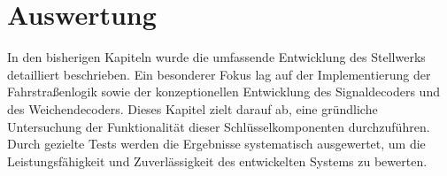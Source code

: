 \chapter{Auswertung}\label{text:Auswertung}

In den bisherigen Kapiteln wurde die umfassende Entwicklung des Stellwerks detailliert beschrieben. Ein besonderer Fokus lag auf der Implementierung der Fahrstraßenlogik sowie der konzeptionellen Entwicklung des Signaldecoders und des Weichendecoders. Dieses Kapitel zielt darauf ab, eine gründliche Untersuchung der Funktionalität dieser Schlüsselkomponenten durchzuführen. Durch gezielte Tests werden die Ergebnisse systematisch ausgewertet, um die Leistungsfähigkeit und Zuverlässigkeit des entwickelten Systems zu bewerten.


\newpage

\newpage

\newpage